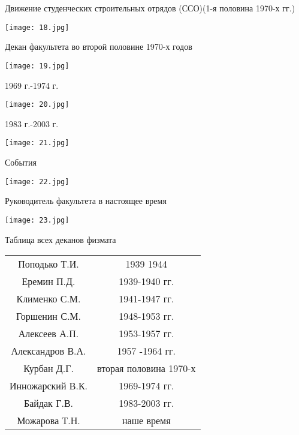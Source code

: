 \documentclass[pdf,hyperref={unicode}, aspectratio=43, serif,11pt]{beamer}
\begin{document}
\begin{frame}{Движение студенческих строительных отрядов (ССО)(1-я половина 1970-х гг.)}
    \begin{center}
        \texttt{[image: 18.jpg]}
    \end{center}
\end{frame}
\begin{frame}{Декан факультета во второй половине 1970-х годов}
    \begin{center}
        \texttt{[image: 19.jpg]} \\
        \caption{Дмитрий Григорьевич Курбан}
    \end{center}
\end{frame}
\begin{frame}{1969 г.-1974 г.}
    \begin{center}
        \texttt{[image: 20.jpg]} \\
        \caption{Вениамин Константинович Инножарский(декан физмата)-одним из первых в нашем вузе стал преподавать программирование}
    \end{center}
\end{frame}
\begin{frame}{1983 г.-2003 г.}
    \begin{center}
        \texttt{[image: 21.jpg]} \\
        \caption{Байдак Геннадий Васильевич(декан физмата)}
    \end{center}
\end{frame}
\begin{frame}{События}
    \begin{center}
        \texttt{[image: 22.jpg]}
    \end{center}
\end{frame}
\begin{frame}{Руководитель факультета в настоящее время}
    \begin{center}
        \texttt{[image: 23.jpg]} \\
        \caption{Т.Н. Можарова(профессор, кандидат физико-математических наук)}
    \end{center}
\end{frame}
\begin{frame}{Таблица всех деканов физмата}
    \begin{tabular}{|c|S|}
        \hline
        Поподько Т.И. & 1939 1944 \\
        Еремин П.Д. & 1939-1940 гг.\\
        Клименко С.М. & 1941-1947 гг. \\
        Горшенин С.М. & 1948-1953 гг. \\
        Алексеев А.П. & 1953-1957 гг. \\
        Александров В.А. & 1957 -1964 гг. \\ 
        Курбан Д.Г. & вторая половина 1970-х \\
        Инножарский В.К. & 1969-1974 гг. \\
        Байдак Г.В. & 1983-2003 гг. \\
        Можарова Т.Н. & наше время \\
        \hline
    \end{tabular}
\end{frame}
\end{document}

